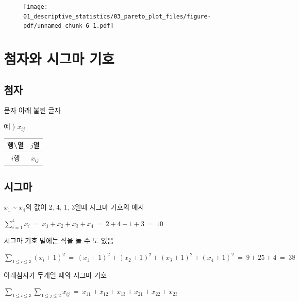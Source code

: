 \documentclass[
  letterpaper,
  DIV=11,
  numbers=noendperiod]{scrreprt}
\begin{document}
\begin{figure}[H]

{\centering \texttt{[image: 01\_descriptive\_statistics/03\_pareto\_plot\_files/figure-pdf/unnamed-chunk-6-1.pdf]}

}

\end{figure}

\hypertarget{uxcca8uxc790uxc640-uxc2dcuxadf8uxb9c8-uxae30uxd638}{%
\chapter{첨자와 시그마
기호}\label{uxcca8uxc790uxc640-uxc2dcuxadf8uxb9c8-uxae30uxd638}}

\hypertarget{uxcca8uxc790}{%
\section{첨자}\label{uxcca8uxc790}}

문자 아래 붙힌 글자

예 ) \(x_{ij}\)

\begin{longtable}[]{@{}cc@{}}
\toprule\noalign{}
행\textbackslash 열 & \(j\)열 \\
\midrule\noalign{}
\endhead
\bottomrule\noalign{}
\endlastfoot
\(i\)행 & \(x _{ij}\) \\
\end{longtable}

\hypertarget{section}{%
\section{}\label{section}}

\hypertarget{uxc2dcuxadf8uxb9c8}{%
\section{시그마}\label{uxc2dcuxadf8uxb9c8}}

\(x_1\) \textasciitilde{} \(x_4\)의 값이 2, 4, 1, 3일때 시그마 기호의
예시

\(\sum\limits_{i=1}^4x_i \ =\  x_1 + x_2 + x_3 + x_4\ =\ 2+4+1+3\ =\ 10\)

시그마 기호 밑에는 식을 둘 수 도 있음

\(\sum\limits_{1\leq i \leq3}(x_i+1)^2 \ =\ (x_1+1)^2+(x_2+1)^2+(x_3+1)^2+(x_4+1)^2\  =\  9+25+4\  =\ 38\)

아래첨자가 두개일 때의 시그마 기호

\(\sum\limits_{1\leq i \leq3} \sum\limits_{1\leq j \leq2}x_{ij} \ =\ x_{11}+x_{12}+x_{13}+x_{21}+x_{22}+x_{23}\)
\end{document}
